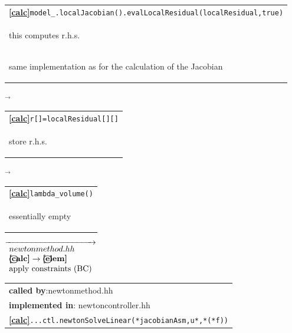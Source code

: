 \begin{landscape}
{\begin{tabular}{|l|}
      \textbf{\textcircled{\ref{calc}}}\verb+model_.localJacobian().evalLocalResidual(localResidual,true)+ \\
    \begin{scriptsize}this computes r.h.s.\end{scriptsize}\\
    \begin{scriptsize}same implementation as for the calculation of the Jacobian\end{scriptsize}\\\hline 
  \end{tabular}
    $\overrightarrow{
    }$
     \begin{tabular}{|l|}
      \hline
      \textbf{\textcircled{\ref{calc}}}\verb+r[]=localResidual[][]+ \\
    \begin{scriptsize}store r.h.s.\end{scriptsize}\\\hline 
  \end{tabular}
    $\overrightarrow{
    }$
    \begin{tabular}{|l|}
      \hline
      \textbf{\textcircled{\ref{calc}}}\verb+lambda_volume()+ \\
    \begin{scriptsize}essentially empty\end{scriptsize}\\\hline 
  \end{tabular}
      \nextline
  {\scriptsize$\overrightarrow{
    \begin{array}{l}
      newtonmethod.hh\\
      \textbf{\textcircled{\ref{calc}}} \rightarrow \textbf{\textcircled{\ref{elem}}}\\
      \textnormal{apply constraints (BC)}
    \end{array}
    }$}
    \begin{tabular}{|l|}
      \hline
      \textbf{called by}:newtonmethod.hh\\
      \textbf{implemented in}: newtoncontroller.hh\\  
      \textbf{\textcircled{\ref{calc}}}\texttt{...ctl.newtonSolveLinear(*jacobianAsm,u*,*(*f))} \\

\end{tabular}}
\end{landscape}
